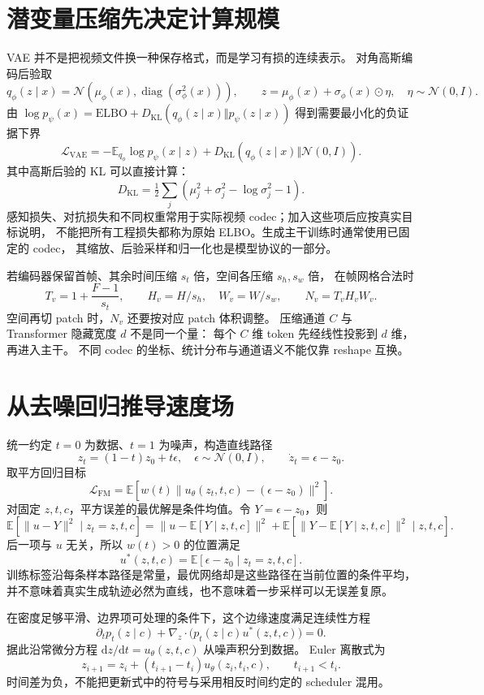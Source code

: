 \section{潜变量压缩先决定计算规模}

VAE 并不是把视频文件换一种保存格式，而是学习有损的连续表示。
对角高斯编码后验取
\[
q_\phi(z\mid x)=\mathcal N\!\left(\mu_\phi(x),
 \operatorname{diag}(\sigma_\phi^2(x))\right),\qquad
z=\mu_\phi(x)+\sigma_\phi(x)\odot\eta,
\quad\eta\sim\mathcal N(0,I).
\]
由 $\log p_\psi(x)=\mathrm{ELBO}+D_{\mathrm{KL}}(q_\phi(z\mid x)\Vert p_\psi(z\mid x))$
得到需要最小化的负证据下界
\[
\mathcal L_{\mathrm{VAE}}=
 -\mathbb E_{q_\phi}\log p_\psi(x\mid z)
 +D_{\mathrm{KL}}\!\left(q_\phi(z\mid x)\Vert\mathcal N(0,I)\right).
\]
其中高斯后验的 KL 可以直接计算：
\[
D_{\mathrm{KL}}=\tfrac12\sum_j
 \left(\mu_j^2+\sigma_j^2-\log\sigma_j^2-1\right).
\]
感知损失、对抗损失和不同权重常用于实际视频 codec；加入这些项后应按真实目标说明，
不能把所有工程损失都称为原始 ELBO。生成主干训练时通常使用已固定的 codec，
其缩放、后验采样和归一化也是模型协议的一部分。

若编码器保留首帧、其余时间压缩 $s_t$ 倍，空间各压缩 $s_h,s_w$ 倍，
在帧网格合法时
\[
T_v=1+\frac{F-1}{s_t},\qquad
H_v=H/s_h,\quad W_v=W/s_w,\qquad
N_v=T_vH_vW_v.
\]
空间再切 patch 时，$N_v$ 还要按对应 patch 体积调整。
压缩通道 $C$ 与 Transformer 隐藏宽度 $d$ 不是同一个量：
每个 $C$ 维 token 先经线性投影到 $d$ 维，再进入主干。
不同 codec 的坐标、统计分布与通道语义不能仅靠 reshape 互换。

\section{从去噪回归推导速度场}

统一约定 $t=0$ 为数据、$t=1$ 为噪声，构造直线路径
\[
z_t=(1-t)z_0+t\epsilon,\quad
\epsilon\sim\mathcal N(0,I),\qquad
\dot z_t=\epsilon-z_0.
\]
取平方回归目标
\[
\mathcal L_{\mathrm{FM}}=
\mathbb E\left[ w(t)\lVert u_\theta(z_t,t,c)-(\epsilon-z_0)\rVert^2\right].
\]
对固定 $z,t,c$，平方误差的最优解是条件均值。令 $Y=\epsilon-z_0$，则
\[
\mathbb E[\lVert u-Y\rVert^2\mid z_t=z,t,c]
=\lVert u-\mathbb E[Y\mid z,t,c]\rVert^2
 +\mathbb E[\lVert Y-\mathbb E[Y\mid z,t,c]\rVert^2\mid z,t,c].
\]
后一项与 $u$ 无关，所以 $w(t)>0$ 的位置满足
\[
u^*(z,t,c)=\mathbb E[\epsilon-z_0\mid z_t=z,t,c].
\]
训练标签沿每条样本路径是常量，最优网络却是这些路径在当前位置的条件平均，
并不意味着真实生成轨迹必然为直线，也不意味着一步采样可以无误差复原。

在密度足够平滑、边界项可处理的条件下，这个边缘速度满足连续性方程
\[
\partial_t p_t(z\mid c)+\nabla_z\cdot\big(p_t(z\mid c)u^*(z,t,c)\big)=0.
\]
据此沿常微分方程 $\mathrm dz/\mathrm dt=u_\theta(z,t,c)$ 从噪声积分到数据。
Euler 离散式为
\[
z_{i+1}=z_i+(t_{i+1}-t_i)u_\theta(z_i,t_i,c),\qquad t_{i+1}<t_i.
\]
时间差为负，不能把更新式中的符号与采用相反时间约定的 scheduler 混用。

